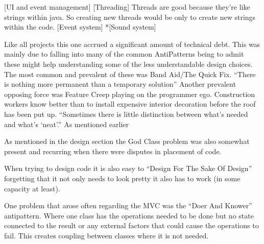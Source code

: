 \documentclass[main.tex]{subfiles}
\begin{document}
[UI and event management]
[Threading]
Threads are good because they’re like strings within java. So creating new threads would be only to create new strings within the code.
[Event system]
*[Sound system]

Like all projects this one accrued a significant amount of technical debt. This was mainly due to falling into many of the common AntiPatterns being to admit these might help understanding some of the less understandable design choices. The most common and prevalent of these was Band Aid/The Quick Fix. 
“There is nothing more permanent than a temporary solution”
Another prevalent opposing force was Feature Creep playing on the programmer ego. Construction workers know better than to install expensive interior decoration before the roof has been put up.
“Sometimes there is little distinction between what's needed and what's ‘neat’.”
As mentioned earlier 

As mentioned in the design section the God Class problem was also somewhat present and recurring when there were disputes in placement of code.

When trying to design code it is also easy to “Design For The Sake Of Design” forgetting that it not only needs to look pretty it also has to work (in some capacity at least).

One problem that arose often regarding the MVC was the “Doer And Knower” antipattern. Where one class has the operations needed to be done but no state connected to the result or any external factors that could cause the operations to fail. This creates coupling between classes where it is not needed.
\end{document}
